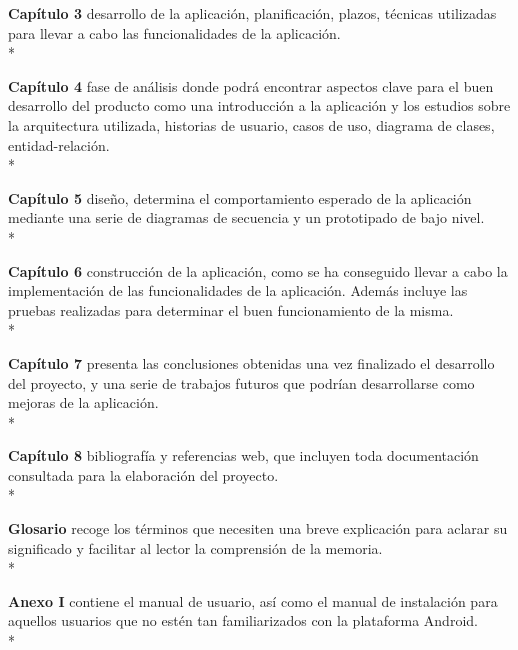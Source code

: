 \documentclass[../pfc.tex]{subfiles}
\begin{document}
  \textbf{Capítulo 3} desarrollo de la aplicación, planificación, plazos, técnicas utilizadas para llevar a cabo las funcionalidades de la aplicación.\\*
  
  \textbf{Capítulo 4} fase de análisis donde podrá encontrar aspectos clave para el buen desarrollo del producto como una introducción a la aplicación y los estudios sobre la arquitectura utilizada, historias de usuario, casos de uso, diagrama de clases, entidad-relación.\\*
  
  \textbf{Capítulo 5} diseño, determina el comportamiento esperado de la aplicación mediante una serie de diagramas de secuencia y un prototipado de bajo nivel.\\*
  
  \textbf{Capítulo 6} construcción de la aplicación, como se ha conseguido llevar a cabo la implementación de las funcionalidades de la aplicación. Además incluye las pruebas realizadas para determinar el buen funcionamiento de la misma.\\*
  
  \textbf{Capítulo 7} presenta las conclusiones obtenidas una vez finalizado el desarrollo del proyecto, y una serie de trabajos futuros que podrían desarrollarse como mejoras de la aplicación.\\*
  
  \textbf{Capítulo 8} bibliografía y referencias web, que incluyen toda documentación consultada para la elaboración del proyecto.\\* 
  
  \textbf{Glosario} recoge los términos que necesiten una breve explicación para aclarar su significado y facilitar al lector la comprensión de la memoria.\\* 
  
  \textbf{Anexo I} contiene el manual de usuario, así como el manual de instalación para aquellos usuarios que no estén tan familiarizados con la plataforma Android.\\*

 
\end{document}
